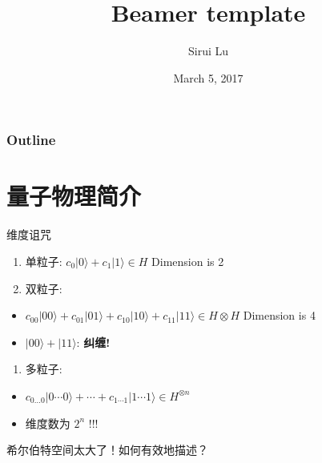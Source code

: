 \documentclass[ignorenonframetext,]{beamer}
\title{Beamer template}
\author{Sirui Lu}
\institute{Department of Physics, Tsinghua University}
\date{March 5, 2017}
\providecommand{\tightlist}{%
  \setlength{\itemsep}{0pt}\setlength{\parskip}{0pt}}
\begin{document}
\frame{\titlepage}

\begin{frame}
\frametitle{Outline} %
\tableofcontents%
\end{frame}

\section{量子物理简介}\label{ux91cfux5b50ux7269ux7406ux7b80ux4ecb}

\begin{frame}{维度诅咒}

\begin{enumerate}
\def\labelenumi{\arabic{enumi}.}
\tightlist
\item
  单粒子: \(c_0|0\rangle+c_1|1\rangle\in H\) Dimension is 2
\item
  双粒子:
\end{enumerate}

\begin{itemize}
\tightlist
\item
  \(c_{00}|00\rangle+c_{01}|01\rangle+c_{10}|10\rangle+c_{11}|11\rangle\in H \otimes H\)
  Dimension is 4
\item
  \(|00\rangle+|11\rangle\): \textbf{纠缠!}
\end{itemize}

\begin{enumerate}
\def\labelenumi{\arabic{enumi}.}
\setcounter{enumi}{2}
\tightlist
\item
  多粒子:
\end{enumerate}

\begin{itemize}
\tightlist
\item
  \(c_{0\dots0}|0\cdots0\rangle+\cdots+c_{1\cdots1}|1\cdots1\rangle \in H^{\otimes n}\)
\item
  维度数为 \textbf{\(2^n\)} !!!
\end{itemize}

希尔伯特空间太大了！如何有效地描述？

\end{frame}
\end{document}
